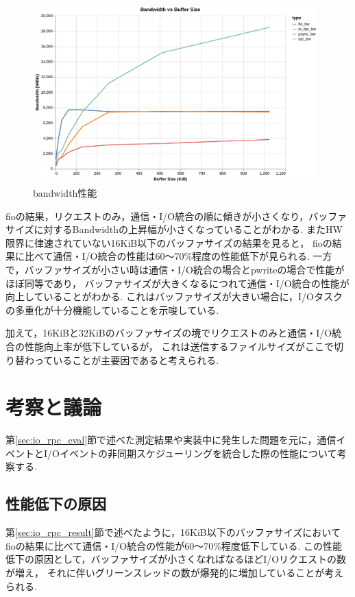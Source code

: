 \documentclass[a4paper,11pt,openany]{jreport}
\begin{document}
\begin{figure}[tb]
	\centering
	\includegraphics[width=11cm, bb=0 0 700 450]{figures/bw_linear_plot.pdf}
	\caption{bandwidth性能}
	\label{fig:io_rpc_bw}
\end{figure}

fioの結果，リクエストのみ，通信・I/O統合の順に傾きが小さくなり，バッファサイズに対するBandwidthの上昇幅が小さくなっていることがわかる.
またHW限界に律速されていない16KiB以下のバッファサイズの結果を見ると，
fioの結果に比べて通信・I/O統合の性能は60〜70\%程度の性能低下が見られる.
一方で，バッファサイズが小さい時は通信・I/O統合の場合とpwriteの場合で性能がほぼ同等であり，
バッファサイズが大きくなるにつれて通信・I/O統合の性能が向上していることがわかる.
これはバッファサイズが大きい場合に，I/Oタスクの多重化が十分機能していることを示唆している.

加えて，16KiBと32KiBのバッファサイズの境でリクエストのみと通信・I/O統合の性能向上率が低下しているが，
これは送信するファイルサイズがここで切り替わっていることが主要因であると考えられる.

\section{考察と議論}\label{sec:discussion}
第\ref{sec:io_rpc_eval}節で述べた測定結果や実装中に発生した問題を元に，通信イベントとI/Oイベントの非同期スケジューリングを統合した際の性能について考察する.

\subsection{性能低下の原因}\label{sec:io_rpc_cause}
第\ref{sec:io_rpc_result}節で述べたように，16KiB以下のバッファサイズにおいて
fioの結果に比べて通信・I/O統合の性能が60〜70\%程度低下している.
この性能低下の原因として，バッファサイズが小さくなればなるほどI/Oリクエストの数が増え，
それに伴いグリーンスレッドの数が爆発的に増加していることが考えられる.
\end{document}
